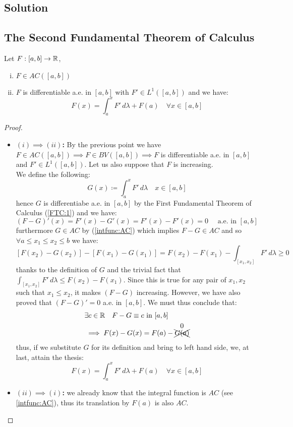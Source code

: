 \subsection*{Solution}

\subsection{The Second Fundamental Theorem of Calculus}\label{FTC:2}
Let $F:[a,b]\to\mathbb{R}$, \tfae
\begin{enumerate}[i)]
    \item $F\in AC([a,b])$
    \item $F$ is differentiable a.e. in $[a,b]$ with $F'\in L^1([a,b])$ and we have:
        \[
           F(x) = \int_a^x F' \, d\lambda + F(a) \quad \forall x \in [a,b] 
        \]
\end{enumerate}

\begin{proof}
    \hspace*{\fill} %
    \begin{itemize}
        \item \textbf{$(i)\implies(ii)$:} 
            By the previous point we have $F\in AC([a,b])\implies F \in BV([a,b])\implies F$ is differentiable a.e. in $[a,b]$ and $F'\in L^1([a,b])$. Let us also suppose that $F$ is increasing. \\
            We define the following:
            \[
                G(x) \coloneqq \int_a^x F' \, d\lambda \quad x\in [a,b]    
            \]
            hence $G$ is differentiabe a.e. in $[a,b]$ by the First Fundamental Theorem of Calculus (\ref{FTC:1}) and we have:
            \[
                (F-G)'(x) = F'(x) - G'(x) = F'(x) - F'(x) = 0 \quad \text{ a.e. in } [a,b]
            \]
            furthermore $G\in AC$ by (\ref{intfunc:AC}) which implies $F-G\in AC$ and so $\forall a\leq x_1 \leq x_2 \leq b$ we have:
            \[
                [F(x_2) - G(x_2)] - [F(x_1) - G(x_1)] = F(x_2) - F(x_1) - \int_{[x_1, x_2]} F' \, d\lambda  \geq 0   
            \]
            thanks to the definition of $G$ and the trivial fact that $\int_{[x_1, x_2]} F' \, d\lambda \leq F(x_2)-F(x_1)$. Since this is true for any pair of  $x_1,x_2$ such that $x_1\leq x_2$, it makes $(F-G)$ increasing. However, we have also proved that $(F-G)'=0$ a.e. in $[a,b]$. We must thus conclude that:
            \begin{align*}
                & \exists c\in\mathbb{R} \quad F-G\equiv c \text{ in } [a,b] \\
                & \implies F(x) - G(x) = F(a) - \overset{\text{\normalsize0}}{\xcancel{G(a)}} 
            \end{align*}
            thus, if we substitute $G$ for its definition and bring to left hand side, we, at last, attain the thesis:
            \[
                F(x) = \int_a^x F' \, d\lambda + F(a) \quad \forall x \in [a,b]
            \]
        \item \textbf{$(ii)\implies(i)$:} 
            we already know that the integral function is $AC$ (see \ref{intfunc:AC}), thus its translation by $F(a)$ is also $AC$.
    \end{itemize}
\end{proof}

